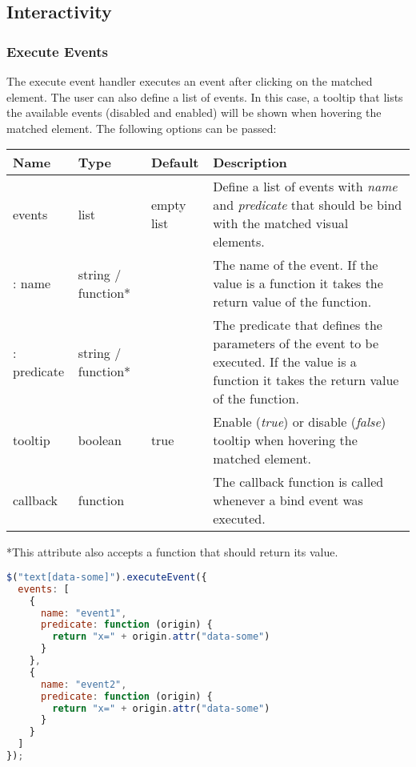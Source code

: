 \pagebreak

\subsection{Interactivity}

\subsubsection{Execute Events}

The execute event handler executes an event after clicking on the matched element.
The user can also define a list of events.
In this case, a tooltip that lists the available events (disabled and enabled) will be shown when hovering the matched element.
The following options can be passed:

\vspace{0.5cm}
\begin{tabular}{ l l l p{7cm} }
  \textbf{Name} & \textbf{Type} & \textbf{Default} & \textbf{Description} \\
  \hline\noalign{\medskip}
  events & list & empty list & Define a list of events with \textit{name} and \textit{predicate} that should be bind with the matched visual elements. \\
  \hline\noalign{\medskip}
  : name & string / function* & & The name of the event. If the value is a function it takes the return value of the function.\\
  \hline\noalign{\medskip}
  : predicate & string / function* & & The predicate that defines the parameters of the event to be executed. If the value is a function it takes the return value of the function.\\
  \hline\noalign{\medskip}
  tooltip & boolean & true & Enable (\textit{true}) or disable (\textit{false}) tooltip when hovering the matched element.\\
  \hline\noalign{\medskip}
  callback & function &  & The callback function is called whenever a bind event was executed.
\end{tabular}

*This attribute also accepts a function that should return its value.

\begin{lstlisting}[language=JavaScript]
$("text[data-some]").executeEvent({
  events: [
    { 
      name: "event1", 
      predicate: function (origin) {
        return "x=" + origin.attr("data-some") 
      }
    },
    {
      name: "event2", 
      predicate: function (origin) {
        return "x=" + origin.attr("data-some")
      }
    } 
  ]
});
\end{lstlisting}
